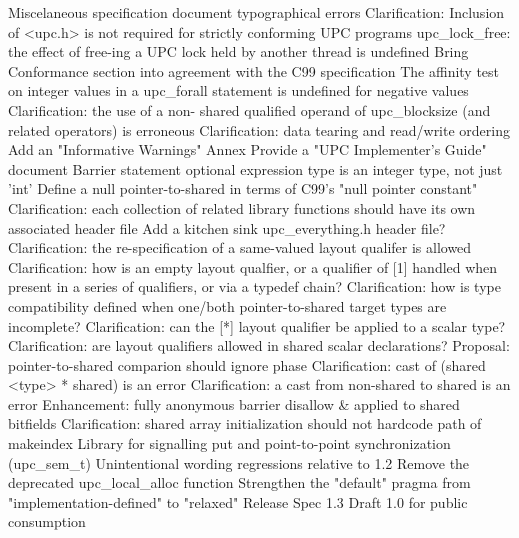 {      \or %
        Miscelaneous specification document typographical errors
      \or %
        Clarification: Inclusion of <upc.h> is not required for strictly conforming UPC programs
      \or %
        upc\_lock\_free: the effect of free-ing a UPC lock held by another thread is undefined
      \or %
        Bring Conformance section into agreement with the C99 specification
      \or %
        The affinity test on integer values in a upc\_forall statement is undefined for negative values
      \or %
        Clarification: the use of a non- shared qualified operand of upc\_blocksize (and related operators) is erroneous
      \or %
        Clarification: data tearing and read/write ordering
      \or %
        Add an "Informative Warnings" Annex
      \or %
        Provide a "UPC Implementer's Guide" document
      \or %
        Barrier statement optional expression type is an integer type, not just 'int'
      \or %
        Define a null pointer-to-shared in terms of C99's "null pointer constant"
      \or %
        Clarification: each collection of related library functions should have its own associated header file
      \or %
        Add a kitchen sink upc\_everything.h header file?
      \or %
        Clarification: the re-specification of a same-valued layout qualifer is allowed
      \or %
        Clarification: how is an empty layout qualfier, or a qualifier of [1] handled when present in a series of qualifiers, or via a typedef chain?
      \or %
        Clarification: how is type compatibility defined when one/both pointer-to-shared target types are incomplete?
      \or %
        Clarification: can the [*] layout qualifier be applied to a scalar type?
      \or %
        Clarification: are layout qualifiers allowed in shared scalar declarations?
      \or %
        Proposal: pointer-to-shared comparion should ignore phase
      \or %
        Clarification: cast of (shared <type> * shared) is an error
      \or %
        Clarification: a cast from non-shared to shared is an error
      \or %
        Enhancement: fully anonymous barrier
      \or %
        disallow & applied to shared bitfields
      \or %
        Clarification: shared array initialization
      \or %
        should not hardcode path of makeindex
      \or %
        Library for signalling put and point-to-point synchronization (upc\_sem\_t)
      \or %
        Unintentional wording regressions relative to 1.2
      \or %
        Remove the deprecated upc\_local\_alloc function
      \or %
        Strengthen the "default" pragma from "implementation-defined" to "relaxed"
      \or %
        Release Spec 1.3 Draft 1.0 for public consumption
    \else
        \empty
    \fi
}
